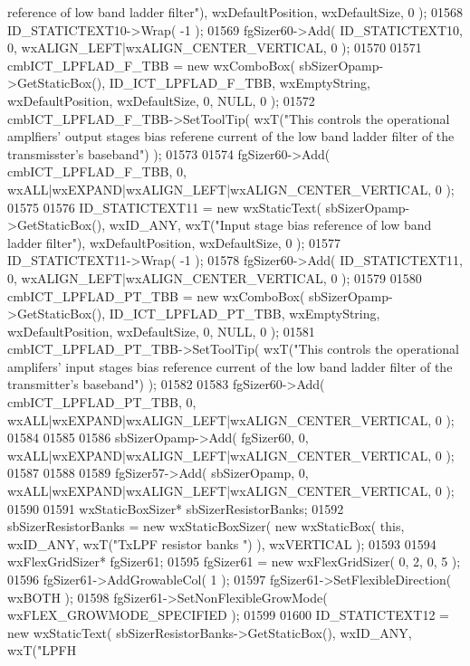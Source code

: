 \begin{DoxyCode}
{       reference of low band ladder filter"}), wxDefaultPosition, wxDefaultSize, 0 );
01568     ID_STATICTEXT10->Wrap( -1 );
01569     fgSizer60->Add( ID_STATICTEXT10, 0, wxALIGN\_LEFT|wxALIGN\_CENTER\_VERTICAL, 0 );
01570     
01571     cmbICT_LPFLAD_F_TBB = \textcolor{keyword}{new} wxComboBox( sbSizerOpamp->GetStaticBox(), 
      ID_ICT_LPFLAD_F_TBB, wxEmptyString, wxDefaultPosition, wxDefaultSize, 0, NULL, 0 ); 
01572     cmbICT_LPFLAD_F_TBB->SetToolTip( wxT(\textcolor{stringliteral}{"This controls the operational amplfiers' output stages bias
       referene current of the low band ladder filter of the transmisster's baseband"}) );
01573     
01574     fgSizer60->Add( cmbICT_LPFLAD_F_TBB, 0, wxALL|wxEXPAND|wxALIGN\_LEFT|wxALIGN\_CENTER\_VERTICAL, 0 );
01575     
01576     ID_STATICTEXT11 = \textcolor{keyword}{new} wxStaticText( sbSizerOpamp->GetStaticBox(), wxID\_ANY, wxT(\textcolor{stringliteral}{"Input stage bias
       reference of low band ladder filter"}), wxDefaultPosition, wxDefaultSize, 0 );
01577     ID_STATICTEXT11->Wrap( -1 );
01578     fgSizer60->Add( ID_STATICTEXT11, 0, wxALIGN\_LEFT|wxALIGN\_CENTER\_VERTICAL, 0 );
01579     
01580     cmbICT_LPFLAD_PT_TBB = \textcolor{keyword}{new} wxComboBox( sbSizerOpamp->GetStaticBox(), 
      ID_ICT_LPFLAD_PT_TBB, wxEmptyString, wxDefaultPosition, wxDefaultSize, 0, NULL, 0 ); 
01581     cmbICT_LPFLAD_PT_TBB->SetToolTip( wxT(\textcolor{stringliteral}{"This controls the operational amplifers' input stages bias
       reference current of the low band ladder filter of the transmitter's baseband"}) );
01582     
01583     fgSizer60->Add( cmbICT_LPFLAD_PT_TBB, 0, wxALL|wxEXPAND|wxALIGN\_LEFT|wxALIGN\_CENTER\_VERTICAL, 0 );
01584     
01585     
01586     sbSizerOpamp->Add( fgSizer60, 0, wxALL|wxEXPAND|wxALIGN\_LEFT|wxALIGN\_CENTER\_VERTICAL, 0 );
01587     
01588     
01589     fgSizer57->Add( sbSizerOpamp, 0, wxALL|wxEXPAND|wxALIGN\_LEFT|wxALIGN\_CENTER\_VERTICAL, 0 );
01590     
01591     wxStaticBoxSizer* sbSizerResistorBanks;
01592     sbSizerResistorBanks = \textcolor{keyword}{new} wxStaticBoxSizer( \textcolor{keyword}{new} wxStaticBox( \textcolor{keyword}{this}, wxID\_ANY, wxT(\textcolor{stringliteral}{"TxLPF resistor banks
      "}) ), wxVERTICAL );
01593     
01594     wxFlexGridSizer* fgSizer61;
01595     fgSizer61 = \textcolor{keyword}{new} wxFlexGridSizer( 0, 2, 0, 5 );
01596     fgSizer61->AddGrowableCol( 1 );
01597     fgSizer61->SetFlexibleDirection( wxBOTH );
01598     fgSizer61->SetNonFlexibleGrowMode( wxFLEX\_GROWMODE\_SPECIFIED );
01599     
01600     ID_STATICTEXT12 = \textcolor{keyword}{new} wxStaticText( sbSizerResistorBanks->GetStaticBox(), wxID\_ANY, wxT(\textcolor{stringliteral}{"LPFH
}
\end{DoxyCode}

